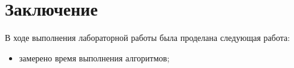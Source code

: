 \chapter*{Заключение}

В ходе выполнения лабораторной работы была проделана следующая работа:

\begin{itemize}
	\item замерено время выполнения алгоритмов;
\end{itemize}

